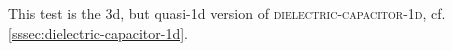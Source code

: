 
This test is the 3d, but quasi-1d version of \textsc{dielectric-capacitor-1d}, cf. \cref{sssec:dielectric-capacitor-1d}.

